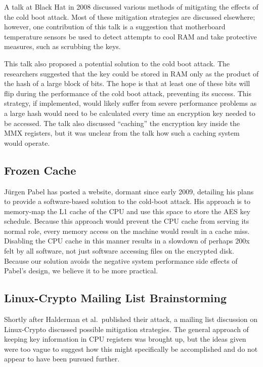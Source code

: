 \documentclass[letterpaper,twocolumn,nonatbib,10pt]{article}
\begin{document}
A talk\cite{blackhat} at Black Hat in 2008 discussed various methods
of mitigating the effects of the cold boot attack.  Most of these
mitigation strategies are discussed elsewhere; however, one
contribution of this talk is a suggestion that motherboard temperature
sensors be used to detect attempts to cool RAM and take protective
measures, such as scrubbing the keys.

This talk also proposed a potential solution to the cold boot attack.
The researchers suggested that the key could be stored in RAM only as
the product of the hash of a large block of bits.  The hope is that at
least one of these bits will flip during the performance of the cold
boot attack, preventing its success.  This strategy, if implemented,
would likely suffer from severe performance problems as a large hash
would need to be calculated every time an encryption key needed to be
accessed.  The talk also discussed ``caching'' the encryption key
inside the MMX registers, but it was unclear from the talk how such a
caching system would operate.

\subsection{Frozen Cache}

J\"{u}rgen Pabel has posted a website\cite{frozencache}, dormant since
early 2009, detailing his plans to provide a software-based solution
to the cold-boot attack.  His approach is to memory-map the L1 cache
of the CPU and use this space to store the AES key schedule.  Because
this approach would prevent the CPU cache from serving its normal
role, every memory access on the machine would result in a cache miss.
Disabling the CPU cache in this manner results in a slowdown of
perhaps 200x\cite{cachegrind} felt by all software, not just software
accessing files on the encrypted disk.  Because our solution avoids
the negative system performance side effects of Pabel's design, we
believe it to be more practical.

\subsection{Linux-Crypto Mailing List Brainstorming}

Shortly after Halderman et al.\ published their attack, a mailing
list discussion on Linux-Crypto discussed possible mitigation
strategies.  The general approach of keeping key information in CPU
registers was brought up\cite{armchair}, but the ideas given were too
vague to suggest how this might specifically be accomplished and do
not appear to have been pursued further.
\end{document}
